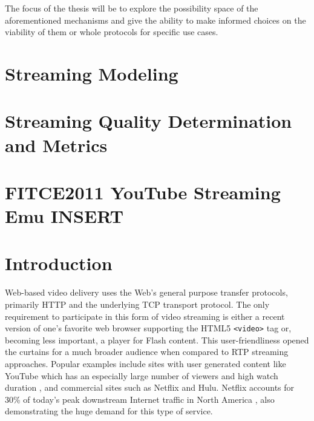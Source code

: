 The focus of the thesis will be to explore the possibility space of the aforementioned mechanisms and give the ability to make informed choices on the viability of them or whole protocols for specific use cases.





\section{Streaming Modeling}




\section{Streaming Quality Determination and Metrics}



\section{FITCE2011 YouTube Streaming Emu INSERT}

\section{Introduction}
\label{sec:introduction}

Web-based video delivery uses the Web's general purpose transfer protocols, primarily HTTP and the underlying TCP transport protocol. The only requirement to participate in this form  of video streaming is either a recent version of one's favorite web browser supporting the HTML5 \texttt{<video>} tag or, becoming less important, a player for Flash content. This user-friendliness opened the curtains for a much broader audience when compared to RTP streaming approaches. Popular examples include sites with user generated content like YouTube which has an especially large number of viewers and high watch duration \cite{comscore2011ranking}, and commercial sites such as Netflix and Hulu. Netflix accounts for 30\% of today's peak downstream Internet traffic in North America \cite{sandvine_spring2011}, also demonstrating the huge demand for this type of service.

